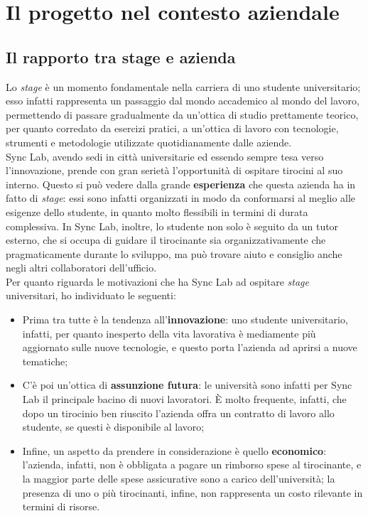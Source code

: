 
\chapter{Il progetto nel contesto aziendale}
\label{cap:progetto-contesto-aziendale}

\section{Il rapporto tra stage e azienda}

Lo \textit{stage} è un momento fondamentale nella carriera di uno studente universitario; esso infatti rappresenta un passaggio dal mondo accademico al mondo del lavoro, permettendo di passare gradualmente da un'ottica di studio prettamente teorico, per quanto corredato da esercizi pratici, a un'ottica di lavoro con tecnologie, strumenti e metodologie utilizzate quotidianamente dalle aziende. \\

Sync Lab, avendo sedi in città universitarie ed essendo sempre tesa verso l'innovazione, prende con gran serietà l'opportunità di ospitare tirocini al suo interno. Questo si può vedere dalla grande \textbf{esperienza} che questa azienda ha in fatto di \textit{stage}: essi sono infatti organizzati in modo da conformarsi al meglio alle esigenze dello studente, in quanto molto flessibili in termini di durata complessiva. In Sync Lab, inoltre, lo studente non solo è seguito da un tutor esterno, che si occupa di guidare il tirocinante sia organizzativamente che pragmaticamente durante lo sviluppo, ma può trovare aiuto e consiglio anche negli altri collaboratori dell'ufficio. \\
Per quanto riguarda le motivazioni che ha Sync Lab ad ospitare \textit{stage} universitari, ho individuato le seguenti:
\begin{itemize}
  \item Prima tra tutte è la tendenza all'\textbf{innovazione}: uno studente universitario, infatti, per quanto inesperto della vita lavorativa è mediamente più aggiornato sulle nuove tecnologie, e questo porta l'azienda ad aprirsi a nuove tematiche;
  \item C'è poi un'ottica di \textbf{assunzione futura}: le università sono infatti per Sync Lab il principale bacino di nuovi lavoratori. È molto frequente, infatti, che dopo un tirocinio ben riuscito l'azienda offra un contratto di lavoro allo studente, se questi è disponibile al lavoro;
  \item Infine, un aspetto da prendere in considerazione è quello \textbf{economico}: l'azienda, infatti, non è obbligata a pagare un rimborso spese al tirocinante, e la maggior parte delle spese assicurative sono a carico dell'università; la presenza di uno o più tirocinanti, infine, non rappresenta un costo rilevante in termini di risorse.
\end{itemize}

